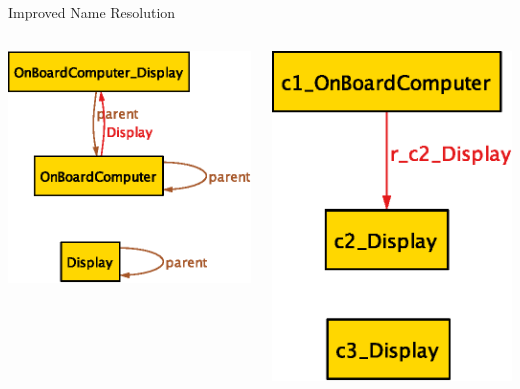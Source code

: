 \documentclass[table,15pt,t]{beamer}
\newcounter{i}
\begin{document}
\begin{frame}{Improved Name Resolution}
  \begin{columns}
    \begin{column}{0.6\textwidth}
      \includegraphics[scale=0.7]{figs/resolve-old}
    \end{column}
    \begin{column}{0.5\textwidth}
      \includegraphics[scale=0.5]{figs/resolve-new}

\end{column}
\end{columns}
\end{frame}
\end{document}
